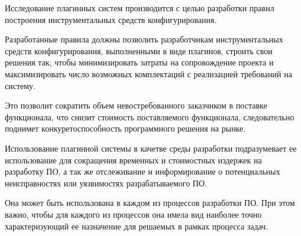 Исследование плагинных систем производится с целью разработки правил построения инструментальных средств конфигурирования.

Разработанные правила должны позволить разработчикам инструментальных средств конфигурирования, выполненными в виде плагинов, строить свои решения так, чтобы минимизировать затраты на сопровождение проекта и максимизировать число возможных комплектаций с реализацией требований на систему.

Это позволит сократить объем невостребованного заказчиком в поставке функционала, что снизит стоимость поставляемого функционала, следовательно поднимет конкуретоспособность программного решения на рынке.

Использование плагинной системы в качетве среды разработки подразумевает ее использование для сокращения временных и стоимостных издержек на разработку ПО, а так же отслеживание и информирование о потенциальных неисправностях или уязвимостях разрабатываемого ПО.

Она может быть использована в каждом из процессов разработки ПО. При этом важно, чтобы для каждого из процессов она имела вид наиболее точно характеризующий ее назначение для решаемых в рамках процесса задач.
